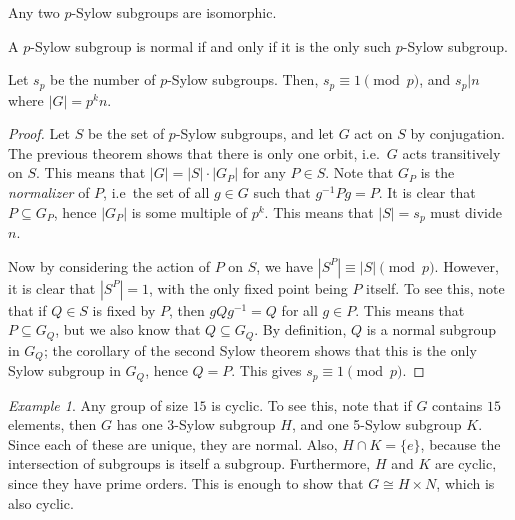 \documentclass[11pt]{article}
\theoremstyle{definition}
\theoremstyle{remark}
\newtheorem*{example}{Example}
\numberwithin{equation}{section}
\begin{document}
    \begin{corollary}
        Any two $p$-Sylow subgroups are isomorphic.
    \end{corollary}
    \begin{corollary}
        A $p$-Sylow subgroup is normal if and only if it is the only such $p$-Sylow
        subgroup.
    \end{corollary}
    
    \begin{theorem}
        Let $s_p$ be the number of $p$-Sylow subgroups. Then, $s_p \equiv 1
        \pmod{p}$, and $s_p | n$ where $|G| = p^k n$.
    \end{theorem}
    \begin{proof}
        Let $S$ be the set of $p$-Sylow subgroups, and let $G$ act on $S$ by
        conjugation. The previous theorem shows that there is only one orbit, i.e.\
        $G$ acts transitively on $S$. This means that $|G| = |S|\cdot |G_P|$ for any $P
        \in S$. Note that $G_P$ is the \emph{normalizer} of $P$, i.e\ the set of all
        $g \in G$ such that $g^{-1}Pg = P$. It is clear that $P \subseteq G_P$, hence
        $|G_P|$ is some multiple of $p^k$. This means that $|S| = s_p$ must divide
        $n$.

        Now by considering the action of $P$ on $S$, we have $|S^P| \equiv |S|
        \pmod{p}$. However, it is clear that $|S^P| = 1$, with the only fixed point
        being $P$ itself. To see this, note that if $Q \in S$ is fixed by $P$, then
        $gQg^{-1} = Q$ for all $g \in P$. This means that $P \subseteq G_Q$, but we
        also know that $Q \subseteq G_Q$. By definition, $Q$ is a normal subgroup in
        $G_Q$; the corollary of the second Sylow theorem shows that this is the only
        Sylow subgroup in $G_Q$, hence $Q = P$. This gives $s_p \equiv 1 \pmod{p}$.
    \end{proof}

    \begin{example}
        Any group of size $15$ is cyclic. To see this, note that if $G$ contains $15$
        elements, then $G$ has one 3-Sylow subgroup $H$, and one 5-Sylow subgroup
        $K$. Since each of these are unique, they are normal. Also, $H \cap K =
        \{e\}$, because the intersection of subgroups is itself a subgroup.
        Furthermore, $H$ and $K$ are cyclic, since they have prime orders.  This is
        enough to show that $G \cong H \times N$, which is also cyclic.
    \end{example}
\end{document}
